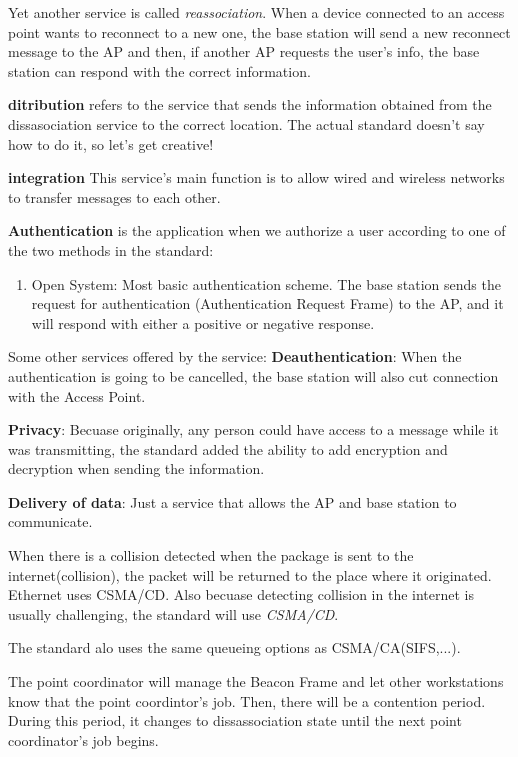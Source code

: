 \documentclass{article}
\begin{document}
Yet another service is called \textit{reassociation}. When a device connected to an access point wants to reconnect to a 
new one, the base station will send a new reconnect message to the AP and then, if another AP requests the user's info,
the base station can respond with the correct information.

\textbf{ditribution} refers to the service that sends the information obtained from the dissasociation service to the 
correct location. The actual standard doesn't say how to do it, so let's get creative!

\textbf{integration} This service's main function is to allow wired and wireless networks to transfer messages to each
other.

\textbf{Authentication} is the application when we authorize a user according to one of the two methods in the standard:
\begin{enumerate}
		\item{Open System}: Most basic authentication scheme. The base station sends the request for authentication 
				(Authentication Request Frame) to the AP, and it will respond with either a positive or negative 
				response.
\end{enumerate}
Some other services offered by the service:
\textbf{Deauthentication}: When the authentication is going to be cancelled, the base station will also cut connection
with the  Access Point.

\textbf{Privacy}: Becuase originally, any person could have access to a message while it was transmitting, the standard
added the ability to add encryption and decryption when sending the information.

\textbf{Delivery of data}: Just a service that allows the AP and base station to communicate.

When there is a collision detected when the package is sent to the internet(collision), the packet will be returned 
to the place where it originated. Ethernet uses CSMA/CD. Also becuase detecting collision in the internet is usually 
challenging, the standard will use \textit{CSMA/CD}.

The standard alo uses the same queueing options as CSMA/CA(SIFS,...).

The point coordinator will manage the Beacon Frame and let other workstations know that the point coordintor's job. Then,
there will be a contention period. During this period, it changes to dissassociation state until the next point 
coordinator's job begins.
\end{document}
